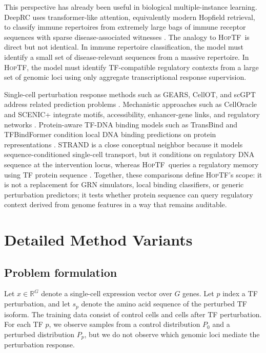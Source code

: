 \documentclass{article}
\newcommand{\hoptf}{\textsc{HopTF}}
\begin{document}
This perspective has already been useful in biological multiple-instance learning. DeepRC uses transformer-like attention, equivalently modern Hopfield retrieval, to classify immune repertoires from extremely large bags of immune receptor sequences with sparse disease-associated witnesses \citep{widrich2020}. The analogy to \hoptf\ is direct but not identical. In immune repertoire classification, the model must identify a small set of disease-relevant sequences from a massive repertoire. In \hoptf, the model must identify TF-compatible regulatory contexts from a large set of genomic loci using only aggregate transcriptional response supervision.

Single-cell perturbation response methods such as GEARS, CellOT, and scGPT address related prediction problems \citep{roohani2023,bunne2023,cui2024}. Mechanistic approaches such as CellOracle and SCENIC+ integrate motifs, accessibility, enhancer-gene links, and regulatory networks \citep{kamimoto2023,gonzalezblas2023}. Protein-aware TF-DNA binding models such as TransBind and TFBindFormer condition local DNA binding predictions on protein representations \citep{basnet2026,liutfbindformer2026}. STRAND is a close conceptual neighbor because it models sequence-conditioned single-cell transport, but it conditions on regulatory DNA sequence at the intervention locus, whereas \hoptf\ queries a regulatory memory using TF protein sequence \citep{fu2026}. Together, these comparisons define \hoptf's scope: it is not a replacement for GRN simulators, local binding classifiers, or generic perturbation predictors; it tests whether protein sequence can query regulatory context derived from genome features in a way that remains auditable.

\section{Detailed Method Variants}
\label{app:detailed_methods}

\subsection{Problem formulation}

Let \(x \in \mathbb{R}^G\) denote a single-cell expression vector over \(G\) genes. Let \(p\) index a TF perturbation, and let \(s_p\) denote the amino acid sequence of the perturbed TF isoform. The training data consist of control cells and cells after TF perturbation. For each TF \(p\), we observe samples from a control distribution \(P_0\) and a perturbed distribution \(P_p\), but we do not observe which genomic loci mediate the perturbation response.
\end{document}
